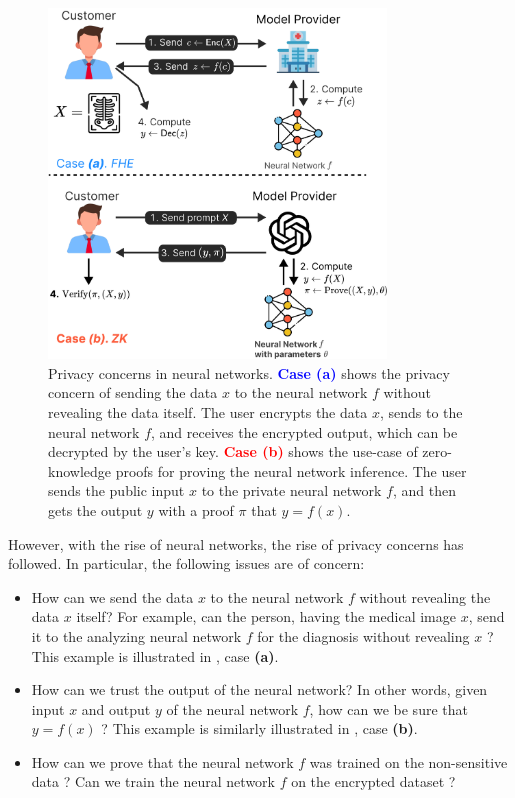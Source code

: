 \documentclass[12pt,a4paper,oneside]{book}
\theoremstyle{dplplain}
\theoremstyle{dpldefinition}
\theoremstyle{dplremark}
\begin{document}
\begin{figure}
    \centering
    \includegraphics[width=0.8\textwidth]{figures/use-cases.pdf}
    \caption{Privacy concerns in neural networks. \textcolor{blue}{\textbf{Case (a)}} shows 
    the privacy concern of sending the data $x$ to the neural network $f$ without
    revealing the data itself. The user encrypts the data $x$, sends to the 
    neural network $f$, and receives the encrypted output, which can be 
    decrypted by the user's key. \textcolor{red}{\textbf{Case (b)}} shows the use-case 
    of zero-knowledge proofs for proving the neural network inference. The user
    sends the public input $x$ to the private neural network $f$, and then
    gets the output $y$ with a proof $\pi$ that $y = f(x)$.}
    \label{fig:nn-privacy}
\end{figure}

However, with the rise of neural networks, the rise of privacy concerns has
followed. In particular, the following issues are of concern:
\begin{itemize}
    \item How can we send the data $x$ to the neural network $f$ without
    revealing the data $x$ itself? For example, can the person, having the
    medical image $x$, send it to the analyzing neural network $f$ for the
    diagnosis without revealing $x$ \cite{cryptonets}? This example is illustrated 
    in , case \textbf{(a)}.
    \item How can we trust the output of the neural network? In other words,
    given input $x$ and output $y$ of the neural network $f$, how can we be sure
    that $y = f(x)$ \cite{nn-ezkl}? This example is similarly illustrated in
    , case \textbf{(b)}.
    \item How can we prove that the neural network $f$ was trained on the 
    non-sensitive data \cite{zk-training}? Can we train the neural network $f$ on the encrypted
    dataset \cite{fhe-training}?
\end{itemize}
\end{document}
